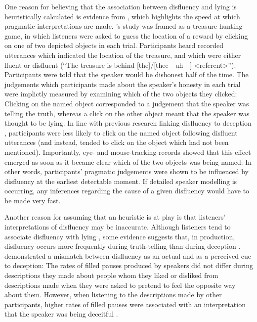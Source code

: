 \documentclass[a4paper,man,natbib]{apa6}
\newcommand*{\spex}[1]{``{#1}''} %
\begin{document}
One reason for believing that the association between disfluency and lying is heuristically calculated is evidence from \citet{Loy2016}, which highlights the speed at which pragmatic interpretations are made.
\citeauthor{Loy2016}'s study was framed as a treasure hunting game, in which listeners were asked to guess the location of a reward by clicking on one of two depicted objects in each trial.
Participants heard recorded utterances which indicated the location of the treasure, and which were either fluent or disfluent (\spex{The treasure is behind [the]/[thee---uh---] \textless referent\textgreater}).
Participants were told that the speaker would be dishonest half of the time. 
The judgements which participants made about the speaker's honesty in each trial were implictly measured by examining which of the two objects they clicked:
Clicking on the named object corresponded to a judgement that the speaker was telling the truth, whereas a click on the other object meant that the speaker was thought to be lying.
In line with previous research linking disfluency to deception \citep{Zuckerman1981},  participants were less likely to click on the named object following disfluent utterances (and instead, tended to click on the object which had not been mentioned).
Importantly, eye- and mouse-tracking records showed that this effect emerged as soon as it became clear which of the two objects was being named:
In other words, participants' pragmatic judgements were shown to be influenced by disfluency at the earliest detectable moment.
If detailed speaker modelling is occurring, any inferences regarding the cause of a given disfluency would have to be made very fast.

Another reason for assuming that an heuristic is at play is that listeners' interpretations of disfluency may be inaccurate.
Although listeners tend to associate disfluency with lying \citep{Loy2016,Zuckerman1981}, some evidence suggests that, in production, disfluency occurs more frequently during truth-telling than during deception \citep{Arciuli2010markers,Arciuli2009lies,Benus2006pauses}.
\citet{DePaulo1982actual} demonstrated a  mismatch between disfluency as an actual and as a perceived cue to deception:
The rates of filled pauses produced by speakers did not differ during descriptions they made about people whom they liked or disliked from descriptions made when they were asked to pretend to feel the opposite way about them. 
However, when listening to the descriptions made by other participants, higher rates of filled pauses were associated with an interpretation that the speaker was being deceitful \citep[see also][]{loy2016lying}.
\end{document}
